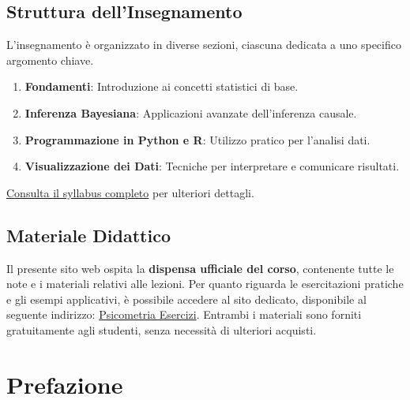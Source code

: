 \documentclass[
  letterpaper,
  DIV=11,
  numbers=noendperiod]{scrreprt}
\providecommand{\tightlist}{%
  \setlength{\itemsep}{0pt}\setlength{\parskip}{0pt}}\usepackage{longtable,booktabs,array}
\theoremstyle{definition}
\theoremstyle{remark}
\begin{document}
\section*{Struttura dell'Insegnamento}\label{struttura-dellinsegnamento}


L'insegnamento è organizzato in diverse sezioni, ciascuna dedicata a uno
specifico argomento chiave.

\begin{enumerate}
\def\labelenumi{\arabic{enumi}.}
\tightlist
\item
  \textbf{Fondamenti}: Introduzione ai concetti statistici di base.
\item
  \textbf{Inferenza Bayesiana}: Applicazioni avanzate dell'inferenza
  causale.
\item
  \textbf{Programmazione in Python e R}: Utilizzo pratico per l'analisi
  dati.
\item
  \textbf{Visualizzazione dei Dati}: Tecniche per interpretare e
  comunicare risultati.
\end{enumerate}

\href{syllabus/syllabus.pdf}{Consulta il syllabus completo} per
ulteriori dettagli.

\section*{Materiale Didattico}\label{materiale-didattico}


Il presente sito web ospita la \textbf{dispensa ufficiale del corso},
contenente tutte le note e i materiali relativi alle lezioni. Per quanto
riguarda le esercitazioni pratiche e gli esempi applicativi, è possibile
accedere al sito dedicato, disponibile al seguente indirizzo:
\href{https://ccaudek.github.io/psicometria-esercizi/}{Psicometria
Esercizi}. Entrambi i materiali sono forniti gratuitamente agli
studenti, senza necessità di ulteriori acquisti.


\chapter*{Prefazione}\label{prefazione}
\end{document}

